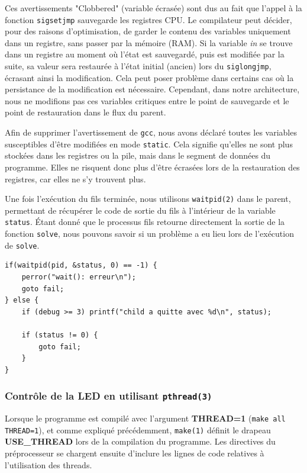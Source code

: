 \documentclass[a4paper,11pt]{article}
\begin{document}
Ces avertissements "Clobbered" (variable écrasée) sont dus au fait que l'appel à la fonction \texttt{sigsetjmp} sauvegarde les registres CPU. Le compilateur peut décider, pour des raisons d'optimisation, de garder le contenu des variables uniquement dans un registre, sans passer par la mémoire (RAM). Si la variable \textit{in} se trouve dans un registre au moment où l'état est sauvegardé, puis est modifiée par la suite, sa valeur sera restaurée à l'état initial (ancien) lors du \texttt{siglongjmp}, écrasant ainsi la modification. Cela peut poser problème dans certains cas où la persistance de la modification est nécessaire. Cependant, dans notre architecture, nous ne modifions pas ces variables critiques entre le point de sauvegarde et le point de restauration dans le flux du parent.

Afin de supprimer l'avertissement de \texttt{gcc}, nous avons déclaré toutes les variables susceptibles d'être modifiées en mode \texttt{static}. Cela signifie qu'elles ne sont plus stockées dans les registres ou la pile, mais dans le segment de données du programme. Elles ne risquent donc plus d'être écrasées lors de la restauration des registres, car elles ne s'y trouvent plus.

Une fois l'exécution du fils terminée, nous utilisons \texttt{waitpid(2)} dans le parent, permettant de récupérer le code de sortie du fils à l'intérieur de la variable \texttt{status}. Étant donné que le processus fils retourne directement la sortie de la fonction \texttt{solve}, nous pouvons savoir si un problème a eu lieu lors de l'exécution de \texttt{solve}.

\begin{verbatim}
if(waitpid(pid, &status, 0) == -1) {
    perror("wait(): erreur\n");
    goto fail;
} else {
    if (debug >= 3) printf("child a quitte avec %d\n", status);

    if (status != 0) {
        goto fail;
    }
}
\end{verbatim}

\subsubsection{Contrôle de la LED en utilisant \texttt{pthread(3)}}

Lorsque le programme est compilé avec l'argument \textbf{THREAD=1} (\texttt{make all THREAD=1}), et comme expliqué précédemment, \texttt{make(1)} définit le drapeau \textbf{USE\_THREAD} lors de la compilation du programme. Les directives du préprocesseur se chargent ensuite d'inclure les lignes de code relatives à l'utilisation des threads.
\end{document}
